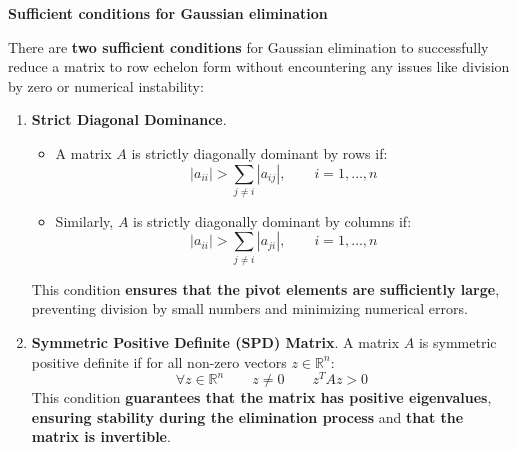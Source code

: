 \begin{flushleft}
    \textcolor{Green3}{ \textbf{Sufficient conditions for Gaussian elimination}}
\end{flushleft}
There are \textbf{two sufficient conditions} for Gaussian elimination to successfully reduce a matrix to row echelon form without encountering any issues like division by zero or numerical instability:
\begin{enumerate}
    \item[\textcolor{Green3}{\faIcon{check}}] \textcolor{Green3}{\textbf{Strict Diagonal Dominance}}.
    \begin{itemize}
        \item A matrix $A$ is strictly diagonally dominant by rows if:
        \begin{equation*}
            \left|a_{ii}\right| > \displaystyle\sum_{j \neq i} \left|a_{ij}\right|, \hspace{2em} i = 1, \dots, n
        \end{equation*}

        \item Similarly, $A$ is strictly diagonally dominant by columns if:
        \begin{equation*}
            \left|a_{ii}\right| > \displaystyle\sum_{j \neq i} \left|a_{ji}\right|, \hspace{2em} i = 1, \dots, n
        \end{equation*}
    \end{itemize}
    This condition \textbf{ensures that the pivot elements are sufficiently large}, preventing division by small numbers and minimizing numerical errors.
    
    \item[\textcolor{Green3}{\faIcon{check}}] \textcolor{Green3}{\textbf{Symmetric Positive Definite (SPD) Matrix}}. A matrix $A$ is symmetric positive definite if for all non-zero vectors $z \in \mathbb{R}^n$:
    \begin{equation*}
        \forall z \in \mathbb{R}^{n} \hspace{2em} z \ne 0 \hspace{2em}  z^{T} A z > 0
    \end{equation*}
    This condition \textbf{guarantees that the matrix has positive eigenvalues}, \textbf{ensuring stability during the elimination process} and \textbf{that the matrix is invertible}.
\end{enumerate}